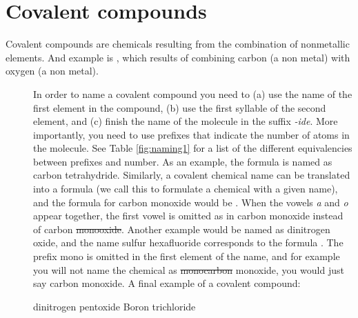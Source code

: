 \documentclass[main.tex]{subfiles}
\begin{document}
\section{Covalent compounds}
Covalent compounds are chemicals resulting from the combination of nonmetallic elements. And example is , which results of combining carbon (a non metal) with oxygen (a non metal).
\sloppy 
\begin{description}
\item[] In order to name a covalent compound you need to (a) use the name of the first element in the compound, (b) use the first syllable of the second element, and (c) finish the name of the molecule in the suffix \emph{-ide}. More importantly, you need to use prefixes that indicate the number of atoms in the molecule. See Table \ref{fig:naming1} for a list of the different equivalencies between prefixes and number.  As an example, the formula  is named as carbon tetrahydride. Similarly, a covalent chemical name can be translated into a formula (we call this to formulate a chemical with a given name), and the formula for carbon monoxide would be . When the vowels \emph{a} and \emph{o} appear together, the first vowel is omitted as in carbon monoxide instead of carbon \sout{monooxide}. Another example would be  named as dinitrogen oxide, and the name sulfur hexafluoride corresponds to the formula . The prefix mono is omitted in the first element of the name, and for example you will not name the chemical  as \sout{monocarbon} monoxide, you would just say carbon monoxide. A final example of a covalent compound:
 \begin{namingbox} {}
  \hfill dinitrogen pentoxide 	\hfill   {} \hfill Boron trichloride  \\
\end{namingbox}




%         




\end{description}
\end{document}
